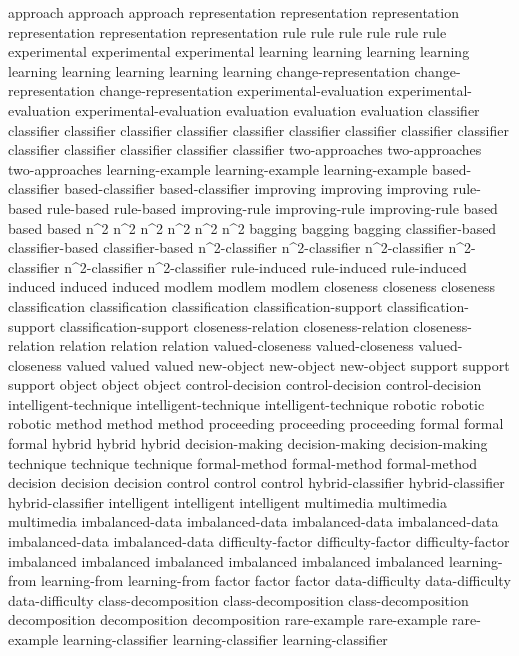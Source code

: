 approach	approach	approach	
representation	representation	representation	representation	representation	representation	
rule	rule	rule	rule	rule	rule	
experimental	experimental	experimental	
learning	learning	learning	learning	learning	learning	learning	learning	learning	
change-representation	change-representation	change-representation	
experimental-evaluation	experimental-evaluation	experimental-evaluation	
evaluation	evaluation	evaluation	
classifier	classifier	classifier	classifier	classifier	classifier	classifier	classifier	classifier	classifier	classifier	classifier	classifier	classifier	classifier	
two-approaches	two-approaches	two-approaches	
learning-example	learning-example	learning-example	
based-classifier	based-classifier	based-classifier	
improving	improving	improving	
rule-based	rule-based	rule-based	
improving-rule	improving-rule	improving-rule	
based	based	based	
n^2	n^2	n^2	n^2	n^2	n^2	
bagging	bagging	bagging	
classifier-based	classifier-based	classifier-based	
n^2-classifier	n^2-classifier	n^2-classifier	n^2-classifier	n^2-classifier	n^2-classifier	
rule-induced	rule-induced	rule-induced	
induced	induced	induced	
modlem	modlem	modlem	
closeness	closeness	closeness	
classification	classification	classification	
classification-support	classification-support	classification-support	
closeness-relation	closeness-relation	closeness-relation	
relation	relation	relation	
valued-closeness	valued-closeness	valued-closeness	
valued	valued	valued	
new-object	new-object	new-object	
support	support	support	
object	object	object	
control-decision	control-decision	control-decision	
intelligent-technique	intelligent-technique	intelligent-technique	
robotic	robotic	robotic	
method	method	method	
proceeding	proceeding	proceeding	
formal	formal	formal	
hybrid	hybrid	hybrid	
decision-making	decision-making	decision-making	
technique	technique	technique	
formal-method	formal-method	formal-method	
decision	decision	decision	
control	control	control	
hybrid-classifier	hybrid-classifier	hybrid-classifier	
intelligent	intelligent	intelligent	
multimedia	multimedia	multimedia	
imbalanced-data	imbalanced-data	imbalanced-data	imbalanced-data	imbalanced-data	imbalanced-data	
difficulty-factor	difficulty-factor	difficulty-factor	
imbalanced	imbalanced	imbalanced	imbalanced	imbalanced	imbalanced	
learning-from	learning-from	learning-from	
factor	factor	factor	
data-difficulty	data-difficulty	data-difficulty	
class-decomposition	class-decomposition	class-decomposition	
decomposition	decomposition	decomposition	
rare-example	rare-example	rare-example	
learning-classifier	learning-classifier	learning-classifier	
